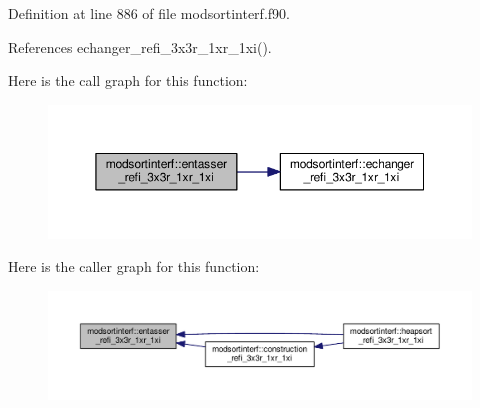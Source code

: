 Definition at line 886 of file modsortinterf.\+f90.



References echanger\+\_\+refi\+\_\+3x3r\+\_\+1xr\+\_\+1xi().



Here is the call graph for this function\+:\nopagebreak
\begin{figure}[H]
\begin{center}
\leavevmode
\includegraphics[width=350pt]{namespacemodsortinterf_a81c24af2921a4ced0ef5df8a45652e14_cgraph}
\end{center}
\end{figure}




Here is the caller graph for this function\+:\nopagebreak
\begin{figure}[H]
\begin{center}
\leavevmode
\includegraphics[width=350pt]{namespacemodsortinterf_a81c24af2921a4ced0ef5df8a45652e14_icgraph}
\end{center}
\end{figure}


